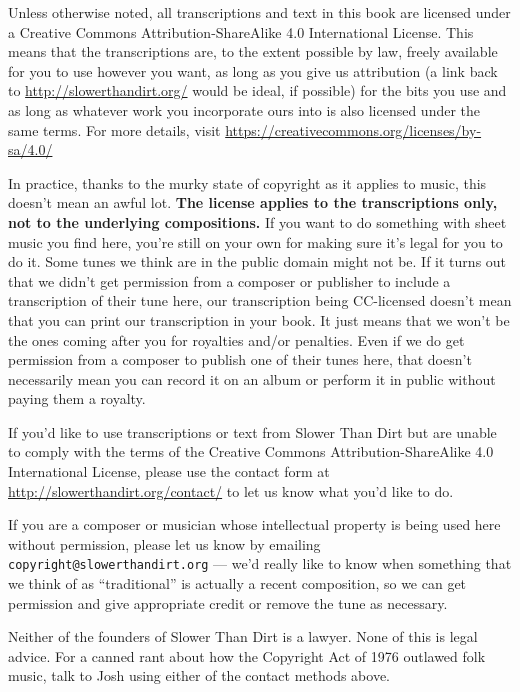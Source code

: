 Unless otherwise noted, all transcriptions and text in this book are
licensed under a Creative Commons Attribution-ShareAlike 4.0
International License. This means that the transcriptions are, to the
extent possible by law, freely available for you to use however you
want, as long as you give us attribution (a link back to
\url{http://slowerthandirt.org/} would be ideal, if possible) for the bits
you use and as long as whatever work you incorporate ours into is also
licensed under the same terms. For more details, visit
\url{https://creativecommons.org/licenses/by-sa/4.0/}

In practice, thanks to the murky state of copyright as it applies to
music, this doesn't mean an awful lot. \textbf{The license applies to the
transcriptions only, not to the underlying compositions.} If you want
to do something with sheet music you find here, you're still on your
own for making sure it's legal for you to do it. Some tunes we think
are in the public domain might not be. If it turns out that we didn't
get permission from a composer or publisher to include a transcription
of their tune here, our transcription being CC-licensed doesn't mean
that you can print our transcription in your book. It just means that
we won't be the ones coming after you for royalties and/or
penalties. Even if we do get permission from a composer to publish one
of their tunes here, that doesn't necessarily mean you can record it
on an album or perform it in public without paying them a royalty.

If you'd like to use transcriptions or text from Slower Than Dirt but
are unable to comply with the terms of the Creative Commons
Attribution-ShareAlike 4.0 International License, please use the
contact form at \url{http://slowerthandirt.org/contact/} to let us know what
you'd like to do.

If you are a composer or musician whose intellectual property is being
used here without permission, please let us know by emailing
{\tt copyright@slowerthandirt.org} — we'd really like to know when something
that we think of as ``traditional'' is actually a recent composition, so
we can get permission and give appropriate credit or remove the tune
as necessary.

Neither of the founders of Slower Than Dirt is a lawyer. None of this
is legal advice. For a canned rant about how the Copyright Act of 1976
outlawed folk music, talk to Josh using either of the contact methods
above.

\clearpage

